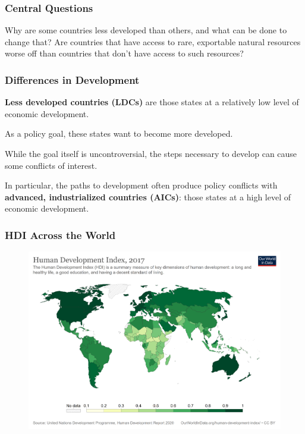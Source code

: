 \documentclass[handout]{beamer}
\begin{document}
\begin{frame} 
\frametitle{\LARGE{Central Questions}}
\centering
\large{Why are some countries less developed than others, and what can be done to change that? Are countries that have access to rare, exportable natural resources worse off than countries that don't have access to such resources?}
\end{frame}


\begin{frame} 
\frametitle{\LARGE{Differences in Development}}
\begin{itemize}
	\large{
		\item \textbf{Less developed countries (LDCs)} are those states at a relatively low level of economic development. \pause
		\item As a policy goal, these states want to become more developed. \pause
		\item While the goal itself is uncontroversial, the steps necessary to develop can cause some conflicts of interest. \pause
		\item In particular, the paths to development often produce policy conflicts with \textbf{advanced, industrialized countries (AICs)}: those states at a high level of economic development.
	}
\end{itemize}
\end{frame}

\begin{frame} 
	\frametitle{\LARGE{HDI Across the World}}
	\begin{figure}[ht!]
		\centering
		\includegraphics[height=\textheight, keepaspectratio]{./hdi.png}
	\end{figure}
\end{frame}
\end{document}
